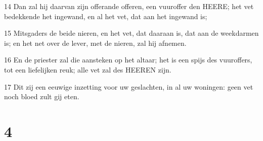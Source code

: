 \par 14 Dan zal hij daarvan zijn offerande offeren, een vuuroffer den HEERE; het vet bedekkende het ingewand, en al het vet, dat aan het ingewand is;
\par 15 Mitsgaders de beide nieren, en het vet, dat daaraan is, dat aan de weekdarmen is; en het net over de lever, met de nieren, zal hij afnemen.
\par 16 En de priester zal die aansteken op het altaar; het is een spijs des vuuroffers, tot een liefelijken reuk; alle vet zal des HEEREN zijn.
\par 17 Dit zij een eeuwige inzetting voor uw geslachten, in al uw woningen: geen vet noch bloed zult gij eten.

\chapter{4}

